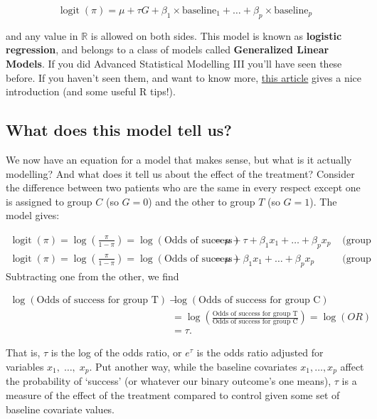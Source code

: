 \documentclass[
  openany]{book}
\theoremstyle{definition}
\theoremstyle{definition}
\theoremstyle{definition}
\theoremstyle{definition}
\theoremstyle{remark}
\begin{document}
\begin{equation}
\operatorname{logit}\left(\pi\right) = \mu + \tau G + \beta_1\times{\text{baseline}_{1}} + \ldots + \beta_p\times{\text{baseline}_{p}}
\label{eq:logreg1}
\end{equation}

and any value in \(\mathbb{R}\) is allowed on both sides. This model is known as \textbf{logistic regression}, and belongs to a class of models called \textbf{Generalized Linear Models}. If you did Advanced Statistical Modelling III you'll have seen these before. If you haven't seen them, and want to know more, \href{https://www.r-bloggers.com/2015/08/generalised-linear-models-in-r/}{this article} gives a nice introduction (and some useful R tips!).

\hypertarget{what-does-this-model-tell-us}{%
\subsection{What does this model tell us?}\label{what-does-this-model-tell-us}}

We now have an equation for a model that makes sense, but what is it actually modelling? And what does it tell us about the effect of the treatment?
Consider the difference between two patients who are the same in every respect except one is assigned to group \(C\) (so \(G=0\)) and the other to group \(T\) (so \(G=1\)). The model gives:

\[
\begin{aligned}
\operatorname{logit}\left(\pi\right) = \log\left(\frac{\pi}{1-\pi}\right) = \log\left(\text{Odds of success}\right) & = \mu + \tau + \beta_1x_1 + \ldots + \beta_px_p & \text{ (group T)}\\
\operatorname{logit}\left(\pi\right) = \log\left(\frac{\pi}{1-\pi}\right) = \log\left(\text{Odds of success}\right) & = \mu + \beta_1x_1 + \ldots + \beta_px_p & \text{ (group C)}
\end{aligned}
\]
Subtracting one from the other, we find

\[
\begin{aligned}
\log(\text{Odds of success for group T}) - & \log(\text{Odds of success for group C})\\
&= 
\log\left(\frac{\text{Odds of success for group T}}{\text{Odds of success for group C}}\right) = \log\left(OR\right) \\
&= \tau.
\end{aligned}
\]

That is, \(\tau\) is the log of the odds ratio, or \(e^\tau\) is the odds ratio adjusted for variables \(x_1,\;\ldots,\;x_p\). Put another way, while the baseline covariates \(x_1,\ldots,x_p\) affect the probability of `success' (or whatever our binary outcome's one means), \(\tau\) is a measure of the effect of the treatment compared to control given some set of baseline covariate values.
\end{document}
